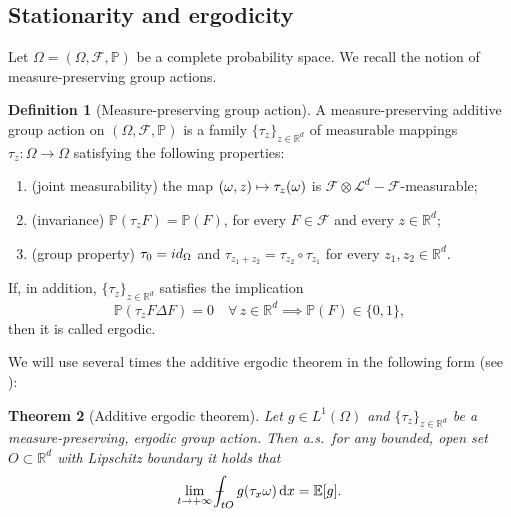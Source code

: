 \documentclass[11pt]{article}
\numberwithin{equation}{section}
\def\mto{\mathchoice{\longmapsto}{\mapsto}{\mapsto}{\mapsto}}
\newtheorem{theorem}{Theorem}[section]
\theoremstyle{definition}
\newtheorem{definition}[theorem]{Definition}
\def\Xint#1{\mathchoice
{\XXint\displaystyle\textstyle{#1}}%
{\XXint\textstyle\scriptstyle{#1}}%
{\XXint\scriptstyle\scriptscriptstyle{#1}}%
{\XXint\scriptscriptstyle\scriptscriptstyle{#1}}%
\!\int}
\def\XXint#1#2#3{{\setbox0=\hbox{$#1{#2#3}{\int}$ }
\vcenter{\hbox{$#2#3$ }}\kern-.57\wd0}}
\def\dashint{\Xint-}
\let\w\omega
\newcommand{\dx}{\,\mathrm{d}x}
\newcommand{\R}{\mathbb{R}}
\renewcommand{\P}{\mathbb{P}}
\newcommand{\F}{\mathcal{F}}
\begin{document}
\subsection{Stationarity and ergodicity}
Let $\Omega=(\Omega,\mathcal{F},\mathbb{P})$ be a complete probability space. We recall the notion of measure-preserving group actions.
%
\begin{definition}[Measure-preserving group action]\label{def:group-action} A measure-preserving additive group action on $(\Omega,\F,\P)$ is a family $\{\tau_z\}_{z\in\R^d}$ of measurable mappings $\tau_z:\Omega\to\Omega$ satisfying the following properties:
%
\begin{enumerate}
\item\label{joint} (joint measurability) the map $(\w,z)\mto\tau_z(\w)$ is $\mathcal{F}\otimes\mathcal{L}^d-\mathcal{F}$-measurable;
\item\label{inv} (invariance) $\P(\tau_z F)=\P(F)$, for every $F\in\F$ and every $z\in\R^d$;
\item\label{group} (group property) $\tau_0=\rm id_\Omega$ and $\tau_{z_1+z_2}=\tau_{z_2}\circ\tau_{z_1}$ for every $z_1,z_2\in\R^d$.
\end{enumerate}
%
If, in addition, $\{\tau_z\}_{z\in\R^d}$ satisfies the implication
%
\begin{equation*}
\mathbb{P}(\tau_zF\Delta F)=0\quad\forall\, z\in\R^d\implies \mathbb{P}(F)\in\{0,1\},
\end{equation*}
%
then it is called ergodic.
\end{definition}
We will use several times the additive ergodic theorem in the following form (see \cite[Prop.\,2.1]{ArSm}):
\begin{theorem}[Additive ergodic theorem]\label{thm.additiv_ergodic}
Let $g\in L^1(\Omega)$ and $\{\tau_z\}_{z\in\R^d}$ be a measure-preserving, ergodic group action. Then a.s.\ for any bounded, open set $O\subset\R^d$ with Lipschitz boundary it holds that
\begin{equation*}
\lim_{t\to +\infty}\dashint_{tO}g(\tau_x\w)\dx=\mathbb{E}[g].
\end{equation*}
\end{theorem}
%
%
\end{document}
